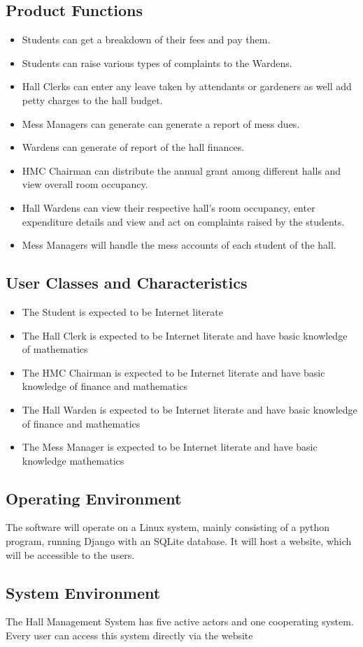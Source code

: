 \documentclass[letterpaper,12pt]{article}
\begin{document}
\subsection{\Large Product Functions}
\begin{itemize}
    \item Students can get a breakdown of their fees and pay them.
    \item Students can raise various types of complaints to the Wardens.
    \item Hall Clerks can enter any leave taken by attendants or gardeners as well add petty charges to the hall budget.
    \item Mess Managers can generate can generate a report of mess dues.
    \item Wardens can generate of report of the hall finances.
    \item HMC Chairman can distribute the annual grant among different halls and view overall room occupancy.
    \item Hall Wardens can view their respective hall's room occupancy, enter expenditure details and view and act on complaints raised by the students.
    \item Mess Managers will handle the mess accounts of each student of the hall.
\end{itemize}
\subsection{\Large User Classes and Characteristics}
\begin{itemize}
    \item The Student is expected to be Internet literate
    \item The Hall Clerk is expected to be Internet literate and have basic knowledge of mathematics
    \item The HMC Chairman is expected to be Internet literate and have basic knowledge of finance and mathematics
    \item The Hall Warden is expected to be Internet literate and have basic knowledge of finance and mathematics
    \item The Mess Manager is expected to be Internet literate and have basic knowledge mathematics
    
\end{itemize}
\subsection{\Large Operating Environment}
The software will operate on a Linux system, mainly consisting of a python program, running Django with an SQLite database. It will host a website, which will be accessible to the users.
\subsection{\Large System Environment}
The Hall Management System has five active actors and one cooperating system. Every user can access this system directly via the website
\end{document}
